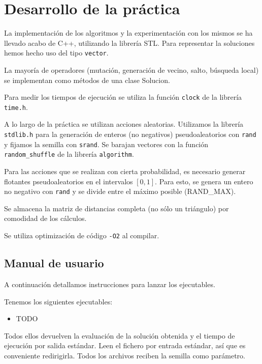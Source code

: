 \documentclass{article}
\begin{document}
\pagebreak

\section{Desarrollo de la práctica}

La implementación de los algoritmos y la experimentación con los mismos se ha llevado acabo de C++, utilizando la librería STL. 
Para representar la soluciones hemos hecho uso del tipo \texttt{vector}.

La mayoría de operadores (mutación, generación de vecino, salto, búsqueda local) se implementan como métodos de una 
clase Solucion.

Para medir los tiempos de ejecución se utiliza la función \texttt{clock} de la librería \texttt{time.h}.

A lo largo de la práctica se utilizan acciones aleatorias. Utilizamos la librería \texttt{stdlib.h} para la generación de
enteros (no negativos) pseudoaleatorios con \texttt{rand} y fijamos la semilla con \texttt{srand}. Se barajan vectores con la función
 \texttt{random\_shuffle} de la librería \texttt{algorithm}.
 
Para las acciones que se realizan con cierta probabilidad, es necesario generar flotantes pseudoaleatorios en el intervalos $[0,1]$.
Para esto, se genera un entero no negativo con \texttt{rand} y se divide entre el máximo posible (RAND\_MAX).

Se almacena la matriz de distancias completa (no sólo un triángulo) por comodidad de los cálculos.

Se utiliza optimización de código \texttt{-O2} al compilar.

\subsection{Manual de usuario}

A continuación detallamos instrucciones para lanzar los ejecutables.

Tenemos los siguientes ejecutables:

\begin{itemize}
\item TODO
\end{itemize}

Todos ellos devuelven la evaluación de la solución obtenida y el tiempo de ejecución por salida estándar.
Leen el fichero por entrada estándar, así que es conveniente redirigirla.
Todos los archivos reciben la semilla como parámetro.
\end{document}
